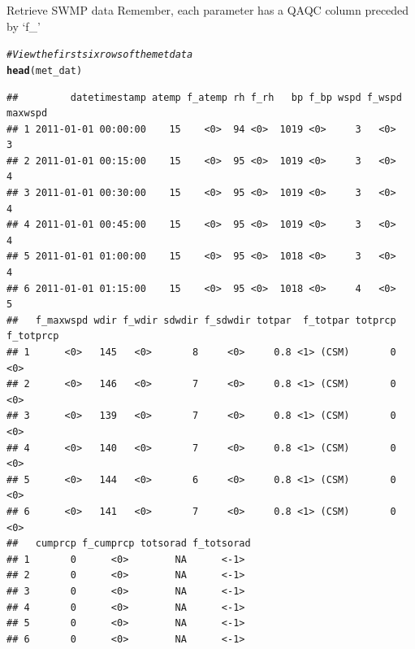 \documentclass[xcolor=svgnames]{beamer}\usepackage[]{graphicx}\usepackage[]{color}
\makeatletter
\newcommand{\hlcom}[1]{\textcolor[rgb]{0.678,0.584,0.686}{\textit{#1}}}%
\newcommand{\hlstd}[1]{\textcolor[rgb]{0.345,0.345,0.345}{#1}}%
\newcommand{\hlkwd}[1]{\textcolor[rgb]{0.737,0.353,0.396}{\textbf{#1}}}%
\newenvironment{kframe}{%
 \def\at@end@of@kframe{}%
 \ifinner\ifhmode%
  \def\at@end@of@kframe{\end{minipage}}%
  \begin{minipage}{\columnwidth}%
 \fi\fi%
 \def\FrameCommand##1{\hskip\@totalleftmargin \hskip-\fboxsep
 \colorbox{shadecolor}{##1}\hskip-\fboxsep
     \hskip-\linewidth \hskip-\@totalleftmargin \hskip\columnwidth}%
 \MakeFramed {\advance\hsize-\width
   \@totalleftmargin\z@ \linewidth\hsize
   \@setminipage}}%
 {\par\unskip\endMakeFramed%
 \at@end@of@kframe}
\newenvironment{knitrout}{}{} %
\makeatother
\begin{document}
\begin{frame}{Retrieve SWMP data}
Remember, each parameter has a QAQC column preceded by `f_'
\begin{knitrout}\scriptsize
{}\color{fgcolor}\begin{kframe}
\begin{alltt}
\hlcom{# View the first six rows of the met data}
\hlkwd{head}\hlstd{(met_dat)}
\end{alltt}
\begin{verbatim}
##         datetimestamp atemp f_atemp rh f_rh   bp f_bp wspd f_wspd maxwspd
## 1 2011-01-01 00:00:00    15    <0>  94 <0>  1019 <0>     3   <0>        3
## 2 2011-01-01 00:15:00    15    <0>  95 <0>  1019 <0>     3   <0>        4
## 3 2011-01-01 00:30:00    15    <0>  95 <0>  1019 <0>     3   <0>        4
## 4 2011-01-01 00:45:00    15    <0>  95 <0>  1019 <0>     3   <0>        4
## 5 2011-01-01 01:00:00    15    <0>  95 <0>  1018 <0>     3   <0>        4
## 6 2011-01-01 01:15:00    15    <0>  95 <0>  1018 <0>     4   <0>        5
##   f_maxwspd wdir f_wdir sdwdir f_sdwdir totpar  f_totpar totprcp f_totprcp
## 1      <0>   145   <0>       8     <0>     0.8 <1> (CSM)       0      <0> 
## 2      <0>   146   <0>       7     <0>     0.8 <1> (CSM)       0      <0> 
## 3      <0>   139   <0>       7     <0>     0.8 <1> (CSM)       0      <0> 
## 4      <0>   140   <0>       7     <0>     0.8 <1> (CSM)       0      <0> 
## 5      <0>   144   <0>       6     <0>     0.8 <1> (CSM)       0      <0> 
## 6      <0>   141   <0>       7     <0>     0.8 <1> (CSM)       0      <0> 
##   cumprcp f_cumprcp totsorad f_totsorad
## 1       0      <0>        NA      <-1> 
## 2       0      <0>        NA      <-1> 
## 3       0      <0>        NA      <-1> 
## 4       0      <0>        NA      <-1> 
## 5       0      <0>        NA      <-1> 
## 6       0      <0>        NA      <-1>
\end{verbatim}
\end{kframe}
\end{knitrout}
\end{frame}
\end{document}
